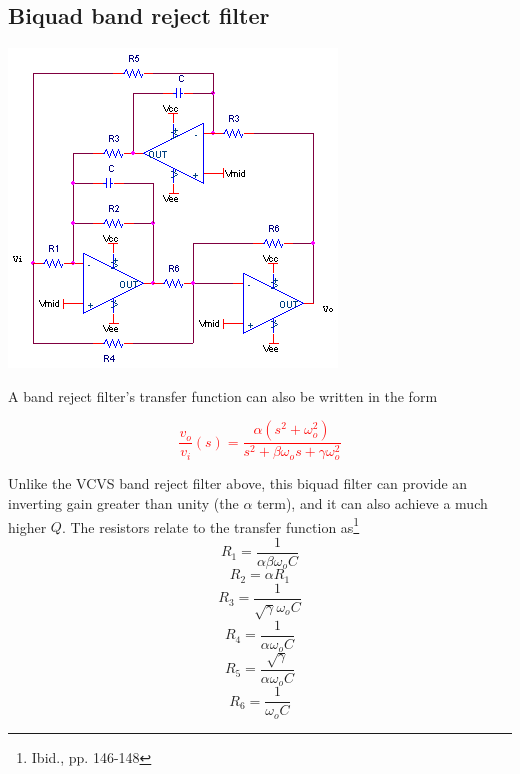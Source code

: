 \subsection{Biquad band reject filter}
\begin{center}
	\includegraphics{schematics/biquad_bandreject.PNG}
\end{center}
A band reject filter's transfer function can also be written in the form 

\textcolor{red}{
\begin{equation}
\frac{v_{o}}{v_{i}}(s) = \frac{\alpha (s^{2} + \omega_{o}^{2})}{s^{2} + \beta \omega_{o}s + \gamma \omega_{o}^{2}}
\label{eq:biquad_bandreject}
\end{equation}
}

Unlike the VCVS band reject filter above, this biquad filter can provide an inverting gain greater than unity (the $\alpha$ term), and it can also achieve a much higher $Q$. The resistors relate to the transfer function as\footnote{Ibid., pp. 146-148}
\begin{equation}
R_{1} = \frac{1}{\alpha \beta \omega_{o}C}
\end{equation}
\begin{equation}
R_{2} = \alpha R_{1}
\end{equation}
\begin{equation}
R_{3} = \frac{1}{\sqrt{\gamma} \omega_{o}C}
\end{equation}
\begin{equation}
R_{4} = \frac{1}{\alpha \omega_{o}C}
\end{equation}
\begin{equation}
R_{5} = \frac{\sqrt{\gamma}}{\alpha \omega_{o}C}
\end{equation}
\begin{equation}
R_{6} = \frac{1}{\omega_{o}C}
\end{equation}

